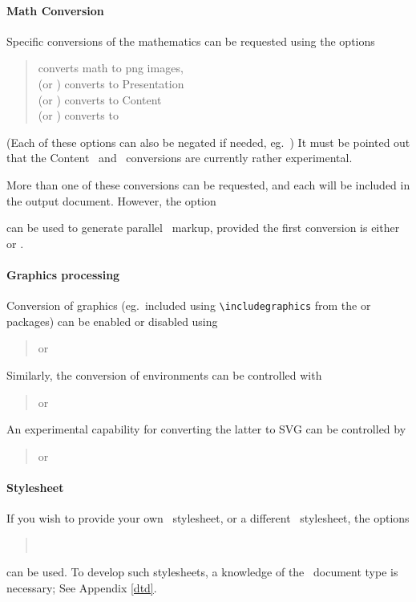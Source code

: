 \documentclass{report}
\begin{document}
\paragraph{Math Conversion}
Specific conversions of the mathematics can be requested
using the options
\begin{quote}
    converts math to png images,\\
  (or ) converts to Presentation \MathML\\
  (or ) converts to Content \MathML\\
  (or ) converts to \OpenMath
\end{quote}
(Each of these options can also be negated if needed, eg.~)
It must be pointed out that the Content \MathML\ and \OpenMath\
conversions are currently rather experimental.

More than one of these conversions can be requested, and
each will be included in the output document.
However, the option
\begin{quote}
\end{quote}
can be used to generate parallel \MathML\ markup, provided the first
conversion is either \code{--pmml} or \code{--cmml}.

\paragraph{Graphics processing}
Conversion of graphics (eg.~included using \verb|\includegraphics| from
the \code{graphics} or \code{graphicx} packages) can be enabled or disabled
using
\begin{quote}
  or 
\end{quote}
Similarly, the conversion of  environments can be controlled with
\begin{quote}
  or 
\end{quote}
An experimental capability for converting the latter to \textsc{SVG} can be
controlled by
\begin{quote}
  or 
\end{quote}

\paragraph{Stylesheet}
If you wish to provide your own \XSLT\ stylesheet, or
a different \CSS\ stylesheet, the options 
\begin{quote}
\\
\end{quote}
 can be used.  To develop such stylesheets, a knowledge
of the \LaTeXML\ document type is necessary; See Appendix \ref{dtd}.
\end{document}
